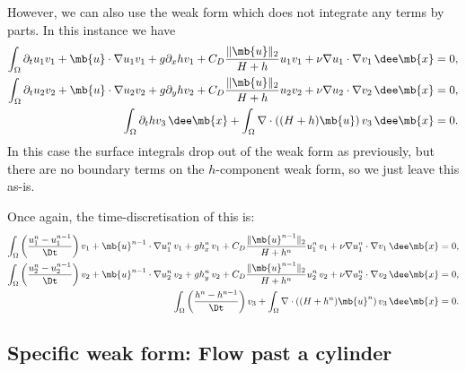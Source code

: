 \documentclass[11pt]{article}
\begin{document}
However, we can also use the weak form which does not integrate any terms by
parts. In this instance we have
\begin{align*}
  \int_\Omega
  \partial_t u_1 v_1 +  \mb{u} \cdot \nabla u_1 v_1 +  g \partial_x h v_1
  + C_D \frac{\lVert \mb{u} \rVert_2}{H + h} u_1 v_1
  + \nu \nabla u_1 \cdot \nabla v_1 \, \dee \mb{x} &= 0, \\
  \int_\Omega \partial_t u_2 v_2 +  \mb{u} \cdot \nabla u_2 v_2 +  g \partial_y h v_2
  + C_D \frac{\lVert \mb{u} \rVert_2}{H + h} u_2 v_2
  + \nu \nabla u_2 \cdot \nabla v_2 \, \dee \mb{x} &= 0, \\
  \int_\Omega \partial_t h v_3 \, \dee \mb{x}
  + \int_\Omega \nabla \cdot \left( (H + h) \mb{u} \right) v_3 \, \dee \mb{x} &= 0.
\end{align*}
In this case the surface integrals drop out of the weak form as previously, but
there are no boundary terms on the $h$-component weak form, so we just leave
this as-is.

Once again, the time-discretisation of this is:
\begin{align*}
  \int_\Omega
  \left(\frac{ u_1^n - u_1^{n - 1}}{\Dt} \right) v_1
  + \mb{u}^{n - 1} \cdot \nabla u_1^n \, v_1
  + g h_x^n \, v_1
  + C_D \frac{\lVert \mb{u}^{n - 1} \rVert_2}{H + h^n} u_1^n \, v_1
  + \nu \nabla u_1^n \cdot \nabla v_1 \, \dee \mb{x} &= 0, \\
  \int_\Omega \left( \frac{u_2^n - u_2^{n - 1}}{\Dt} \right) v_2
  + \mb{u}^{n - 1} \cdot \nabla u_2^n \, v_2
  + g h_y^n \, v_2
  + C_D \frac{\lVert \mb{u}^{n - 1} \rVert_2}{H + h^n} u_2^n \, v_2
  + \nu \nabla u_2^n \cdot \nabla v_2 \, \dee \mb{x} &= 0, \\
  \int_\Omega \left( \frac{h^n - h^{n - 1}}{\Dt} \right) v_3
  + \int_\Omega \nabla \cdot \left( (H + h^n) \mb{u}^n \right) v_3 \, \dee \mb{x} &= 0.
\end{align*}


\subsection*{Specific weak form: Flow past a cylinder}
\end{document}

